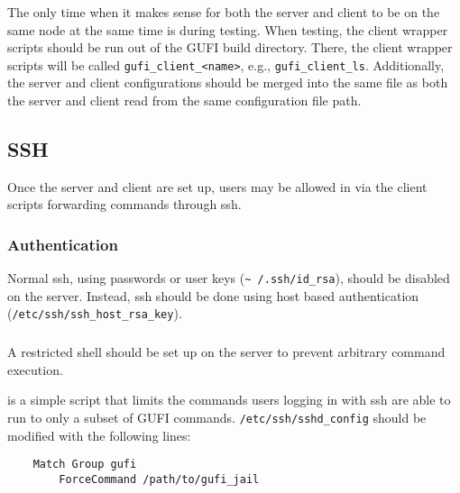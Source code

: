The only time when it makes sense for both the server and client to be
on the same node at the same time is during testing. When testing, the
client wrapper scripts should be run out of the GUFI build
directory. There, the client wrapper scripts will be called
\texttt{gufi\_client\_<name>}, e.g.,
\texttt{gufi\_client\_ls}. Additionally, the server and client
configurations should be merged into the same file as both the server
and client read from the same configuration file path.

\subsection{SSH}
Once the server and client are set up, users may be allowed in via the
client scripts forwarding commands through ssh.

\subsubsection{Authentication}
\label{sec:hostbasedauth}
Normal ssh, using passwords or user keys (\texttt{\textasciitilde
  /.ssh/id\_rsa}), should be disabled on the server. Instead, ssh
should be done using host based authentication
(\texttt{/etc/ssh/ssh\_host\_rsa\_key}).

\subsubsection{\gufijail}
\label{sec:gufi_jail}
A restricted shell should be set up on the server to prevent arbitrary
command execution.

\gufijail is a simple script that limits the commands users logging in
with ssh are able to run to only a subset of GUFI
commands. \texttt{/etc/ssh/sshd\_config} should be modified with the
following lines:

\begin{verbatim}
    Match Group gufi
        ForceCommand /path/to/gufi_jail
\end{verbatim}
